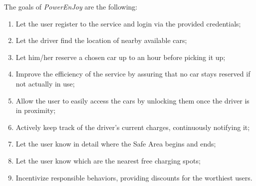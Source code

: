The goals of \hbox{\emph{PowerEnJoy}} are the following:

\begin{enumerate}
\item Let the user register to the service and login via the provided credentials;
\item Let the driver find the location of nearby available cars;
\item Let him/her reserve a chosen car up to an hour before picking it up;
\item Improve the efficiency of the service by assuring that no car stays reserved if not actually in use;
\item Allow the user to easily access the cars by unlocking them once the driver is in proximity;
\item Actively keep track of the driver's current charges, continuously notifying it;
\item Let the user know in detail where the Safe Area begins and ends;
\item Let the user know which are the nearest free charging spots;
\item Incentivize responsible behaviors, providing discounts for the worthiest users.
\end{enumerate}